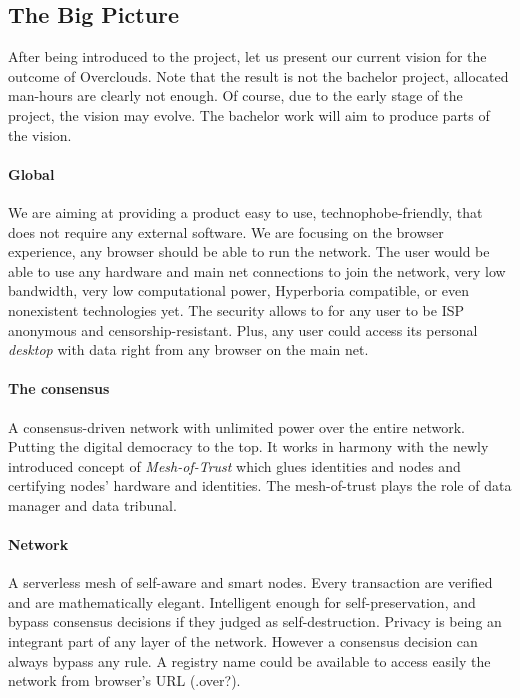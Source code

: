 
\subsection{The Big Picture}
After being introduced to the project, let us present our current vision for the outcome of Overclouds. Note that the result is not the bachelor project, allocated man-hours are clearly not enough. Of course, due to the early stage of the project, the vision may evolve. The bachelor work will aim to produce parts of the vision.

\paragraph{Global}
We are aiming at providing a product easy to use, technophobe-friendly, that does not require any external software. We are focusing on the browser experience, any browser should be able to run the network. The user would be able to use any hardware and main net connections to join the network, very low bandwidth, very low computational power, Hyperboria\cite{HypeHyperboriaWhitepaper} compatible, or even nonexistent technologies yet. The security allows to for any user to be ISP anonymous and censorship-resistant. Plus, any user could access its personal \textit{desktop} with data right from any browser on the main net.

\paragraph{The consensus}
A consensus-driven network with unlimited power over the entire network. Putting the digital democracy to the top. It works in harmony with the newly introduced concept of \textit{Mesh-of-Trust} which glues identities and nodes and certifying nodes' hardware and identities. The mesh-of-trust plays the role of data manager and data tribunal.

\paragraph{Network}
A serverless mesh of self-aware and smart nodes. Every transaction are verified and are mathematically elegant. Intelligent enough for self-preservation, and bypass consensus decisions if they judged as self-destruction. Privacy is being an integrant part of any layer of the network. However a consensus decision can always bypass any rule. A registry name could be available to access easily the network from browser's URL (.over?).

